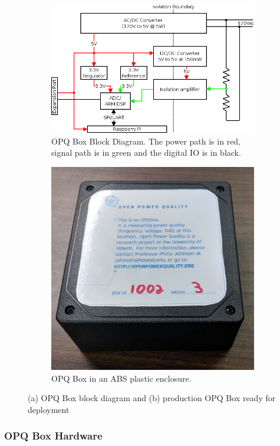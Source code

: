 \begin{figure}[ht]
	\centering
	\begin{subfigure}{.5\textwidth}
	  \centering
	  \includegraphics[width=0.9\linewidth]{images/opq-box/opqbox_diagram.png}
	  \caption{OPQ Box Block Diagram.
	  The power path is in red, signal path is in green and the digital IO is in black.}
	  \label{fig:opq:1:1}
	\end{subfigure}%
	\begin{subfigure}{.5\textwidth}
	  \centering
	  \includegraphics[width=0.7\linewidth]{images/opq-box/opqbox_photo.jpg}
	  \caption{OPQ Box in an ABS plastic enclosure.}
	  \label{fig:opq:1:2}
	\end{subfigure}
	\caption{(a) OPQ Box block diagram and (b) production OPQ Box ready for deployment}
	\label{fig:opq:2}
\end{figure}

\subsubsection{OPQ Box Hardware}\label{subsec:hardware}

